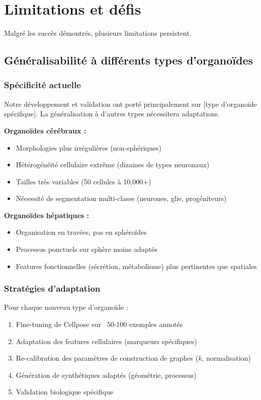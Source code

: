 \section{Limitations et défis}

Malgré les succès démontrés, plusieurs limitations persistent.

\subsection{Généralisabilité à différents types d'organoïdes}

\subsubsection{Spécificité actuelle}

Notre développement et validation ont porté principalement sur [type d'organoïde spécifique]. La généralisation à d'autres types nécessitera adaptations.

\textbf{Organoïdes cérébraux :}
\begin{itemize}
    \item Morphologies plus irrégulières (non-sphériques)
    \item Hétérogénéité cellulaire extrême (dizaines de types neuronaux)
    \item Tailles très variables (50 cellules à 10,000+)
    \item Nécessité de segmentation multi-classe (neurones, glie, progéniteurs)
\end{itemize}

\textbf{Organoïdes hépatiques :}
\begin{itemize}
    \item Organisation en travées, pas en sphéroïdes
    \item Processus ponctuels sur sphère moins adaptés
    \item Features fonctionnelles (sécrétion, métabolisme) plus pertinentes que spatiales
\end{itemize}

\subsubsection{Stratégies d'adaptation}

Pour chaque nouveau type d'organoïde :
\begin{enumerate}
    \item Fine-tuning de Cellpose sur ~50-100 exemples annotés
    \item Adaptation des features cellulaires (marqueurs spécifiques)
    \item Re-calibration des paramètres de construction de graphes ($k$, normalisation)
    \item Génération de synthétiques adaptés (géométrie, processus)
    \item Validation biologique spécifique
\end{enumerate}

